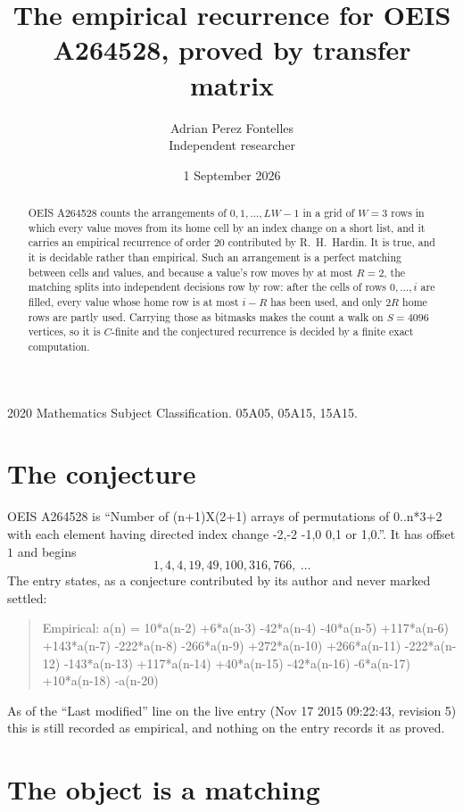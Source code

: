 \documentclass[11pt,a4paper]{article}
\title{The empirical recurrence for OEIS A264528, proved by transfer matrix}
\author{Adrian Perez Fontelles\\ \small Independent researcher}
\date{1 September 2026}
\theoremstyle{plain}
\theoremstyle{definition}
\begin{document}
\maketitle

\begin{abstract}
OEIS A264528 counts the arrangements of $0,1,\dots,LW-1$ in a grid of $W=3$ rows in which
every value moves from its home cell by an index change on a short list, and it carries an
empirical recurrence of order $20$ contributed by R.~H.~Hardin. It is true, and it is
decidable rather than empirical. Such an arrangement is a perfect matching between cells and
values, and because a value's row moves by at most $R=2$, the matching splits into
independent decisions row by row: after the cells of rows $0,\dots,i$ are filled,
every value whose home row is at most $i-R$ has been used, and only $2R$ home rows are
partly used. Carrying those as bitmasks makes the count a walk on $S=4096$ vertices, so it is
$C$-finite and the conjectured recurrence is decided by a finite exact computation.
\end{abstract}

\noindent\small 2020 Mathematics Subject Classification. 05A05, 05A15, 15A15.\normalsize

\section{The conjecture}

OEIS A264528 is ``Number of (n+1)X(2+1) arrays of permutations of 0..n*3+2 with each element having directed index change -2,-2 -1,0 0,1 or 1,0.''. It has offset $1$ and begins
\[
1, 4, 4, 19, 49, 100, 316, 766,\ \dots
\]
The entry states, as a conjecture contributed by its author and never marked settled:
\begin{quote}
Empirical: a(n) = 10*a(n-2) +6*a(n-3) -42*a(n-4) -40*a(n-5) +117*a(n-6) +143*a(n-7) -222*a(n-8) -266*a(n-9) +272*a(n-10) +266*a(n-11) -222*a(n-12) -143*a(n-13) +117*a(n-14) +40*a(n-15) -42*a(n-16) -6*a(n-17) +10*a(n-18) -a(n-20)
\end{quote}
As of the ``Last modified'' line on the live entry (Nov 17 2015 09:22:43, revision 5) this is still
recorded as empirical, and nothing on the entry records it as proved.

\section{The object is a matching}
\end{document}
